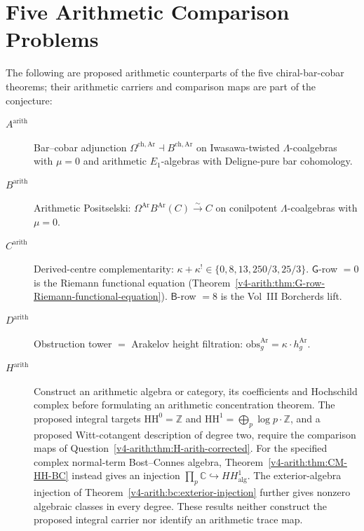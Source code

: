 \section{Five Arithmetic Comparison Problems}
\label{v4-arith:syn:five-theorems-survive}

\begin{conjecture}
\label{v4-arith:thm:arithmetic-avatars}
The following are proposed arithmetic counterparts of the five
chiral-bar-cobar theorems; their arithmetic carriers and comparison
maps are part of the conjecture:
\begin{description}
\item[\(A^{\mathrm{arith}}\)] Bar--cobar adjunction
\(\Omega^{\mathrm{ch,Ar}}\dashv B^{\mathrm{ch,Ar}}\) on Iwasawa-twisted
\(\Lambda\)-coalgebras with \(\mu=0\) and arithmetic \(E_{1}\)-algebras
with Deligne-pure bar cohomology.
\item[\(B^{\mathrm{arith}}\)] Arithmetic Positselski:
\(\Omega^{\mathrm{Ar}}B^{\mathrm{Ar}}(C)\xrightarrow{\sim}C\) on
conilpotent \(\Lambda\)-coalgebras with \(\mu=0\).
\item[\(C^{\mathrm{arith}}\)] Derived-centre complementarity:
\(\kappa+\kappa^{!}\in\{0,8,13,250/3,25/3\}\).
\(\mathsf{G}\)-row \(=0\) is the Riemann functional equation
(Theorem~\ref{v4-arith:thm:G-row-Riemann-functional-equation}).
\(\mathsf{B}\)-row \(=8\) is the Vol~III Borcherds lift.
\item[\(D^{\mathrm{arith}}\)] Obstruction tower \(=\) Arakelov height
filtration: \(\mathrm{obs}_{g}^{\mathrm{Ar}}=\kappa\cdot h_{g}^{\mathrm{Ar}}\).
\item[\(H^{\mathrm{arith}}\)] Construct an arithmetic algebra or
category, its coefficients and Hochschild complex before formulating
an arithmetic concentration theorem. The proposed integral targets
\(\mathrm{HH}^0=\mathbb Z\) and
\(\mathrm{HH}^1=\bigoplus_p\log p\cdot\mathbb Z\), and a proposed
Witt-cotangent description of degree two, require the comparison maps
of Question~\ref{v4-arith:thm:H-arith-corrected}.
For the specified complex normal-term Bost--Connes algebra,
Theorem~\ref{v4-arith:thm:CM-HH-BC} instead gives an injection
\(\prod_p\mathbb C\hookrightarrow HH^1_{\mathrm{alg}}\).
The exterior-algebra injection of
Theorem~\ref{v4-arith:bc:exterior-injection} further gives nonzero
algebraic classes in every degree. These results neither construct
the proposed integral carrier nor identify an arithmetic trace map.
\end{description}
\end{conjecture}

